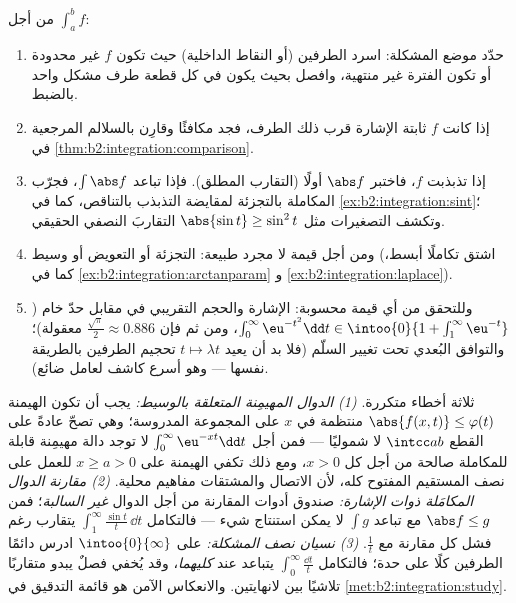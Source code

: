 \begin{method}\label{met:b2:integration:study}
من أجل $\int_a^b f$:
\begin{enumerate}
  \item حدّد موضع المشكلة: اسرد الطرفين (أو النقاط
        الداخلية) حيث تكون $f$ غير محدودة أو تكون الفترة
        غير منتهية، وافصل بحيث يكون في كل قطعة طرف مشكل
        واحد بالضبط.
  \item إذا كانت $f$ ثابتة الإشارة قرب ذلك الطرف، فجد
        مكافئًا وقارِن بالسلالم المرجعية في
        \cref{thm:b2:integration:comparison}.
  \item إذا تذبذبت $f$، فاختبر $\abs f$ أولًا (التقارب
        المطلق). فإذا تباعد $\int\abs f$، فجرّب المكاملة
        بالتجزئة لمقايضة التذبذب بالتناقص، كما في
        \cref{ex:b2:integration:sint}؛ وتكشف التصغيرات مثل
        $\abs{\sin t} \geq \sin^2t$ التقاربَ النصفي
        الحقيقي.
  \item ومن أجل قيمة لا مجرد طبيعة: التجزئة أو التعويض
        أو وسيط (اشتق تكاملًا أبسط، كما في
        \cref{ex:b2:integration:arctanparam} و
        \cref{ex:b2:integration:laplace}).
  \item وللتحقق من أي قيمة محسوبة: الإشارة والحجم التقريبي
        في مقابل حدّ خام ($\int_0^\infty
        \eu^{-t^2}\dd t \in \intoo{0}{1 + \int_1^\infty
        \eu^{-t}}$، ومن ثم فإن $\frac{\sqrt\pi}{2} \approx 0.886$
        معقولة)؛ والتوافق البُعدي تحت تغيير السلّم
        (فلا بد أن يعيد $t \mapsto \lambda t$ تحجيم الطرفين
        بالطريقة نفسها --- وهو أسرع كاشف لعامل ضائع).
\end{enumerate}
\end{method}

\begin{remark}
ثلاثة أخطاء متكررة. \emph{(1) الدوال المهيمِنة المتعلقة
بالوسيط:} يجب أن تكون الهيمنة $\abs{f(x,t)} \leq \varphi(t)$
منتظمة في $x$ على المجموعة المدروسة؛ وهي تصحّ عادةً على
القطع $\intcc ab$ لا شموليًا --- فمن أجل
$\int_0^\infty\eu^{-xt}\dd t$ لا توجد دالة مهيمِنة قابلة للمكاملة
صالحة من أجل كل $x > 0$، ومع ذلك تكفي الهيمنة على $x \geq a > 0$
للعمل على نصف المستقيم المفتوح كله، لأن الاتصال
والمشتقات مفاهيم محلية. \emph{(2) مقارنة الدوال
المكامَلة ذوات الإشارة:} صندوق أدوات المقارنة من أجل الدوال
\emph{غير السالبة}؛ فمن $\abs f \leq g$ مع تباعد $\int g$ لا يمكن
استنتاج شيء --- فالتكامل $\int_1^\infty\frac{\sin t}t\,\dd t$
يتقارب رغم فشل كل مقارنة مع $\frac1t$.
\emph{(3) نسيان نصف المشكلة:} على
$\intoo{0}{\infty}$ ادرس دائمًا الطرفين كلًا على حدة؛
فالتكامل $\int_0^\infty\frac{\dd t}{t}$ يتباعد عند \emph{كليهما}، وقد
يُخفي فصلٌ يبدو متقاربًا تلاشيًا بين لانهايتين.
والانعكاس الآمن هو قائمة التدقيق في
\cref{met:b2:integration:study}.
\end{remark}

